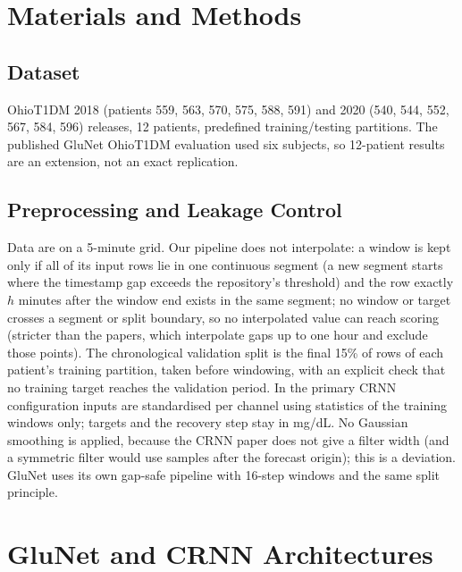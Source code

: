 \documentclass[conference]{IEEEtran}
\begin{document}
\section{Materials and Methods}
\subsection{Dataset}
OhioT1DM 2018 (patients 559, 563, 570, 575, 588, 591) and 2020 (540, 544, 552, 567, 584, 596) releases, 12 patients, predefined training/testing partitions. The published GluNet OhioT1DM evaluation used six subjects, so 12-patient results are an extension, not an exact replication.

\subsection{Preprocessing and Leakage Control}
Data are on a 5-minute grid. Our pipeline does not interpolate: a window is kept only if all of its input rows lie in one continuous segment (a new segment starts where the timestamp gap exceeds the repository's threshold) and the row exactly $h$ minutes after the window end exists in the same segment; no window or target crosses a segment or split boundary, so no interpolated value can reach scoring (stricter than the papers, which interpolate gaps up to one hour and exclude those points). The chronological validation split is the final 15\% of rows of each patient's training partition, taken before windowing, with an explicit check that no training target reaches the validation period. In the primary CRNN configuration inputs are standardised per channel using statistics of the training windows only; targets and the recovery step stay in mg/dL. No Gaussian smoothing is applied, because the CRNN paper does not give a filter width (and a symmetric filter would use samples after the forecast origin); this is a deviation. GluNet uses its own gap-safe pipeline with 16-step windows and the same split principle.

\section{GluNet and CRNN Architectures}
\end{document}
